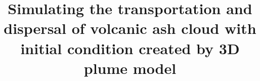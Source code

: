 \documentclass[draft,linenumbers]{agujournal2019}
\begin{document}
%
%


\title{Simulating the transportation and dispersal of volcanic ash cloud with initial condition created by 3D plume model}

%
%










\end{document}
